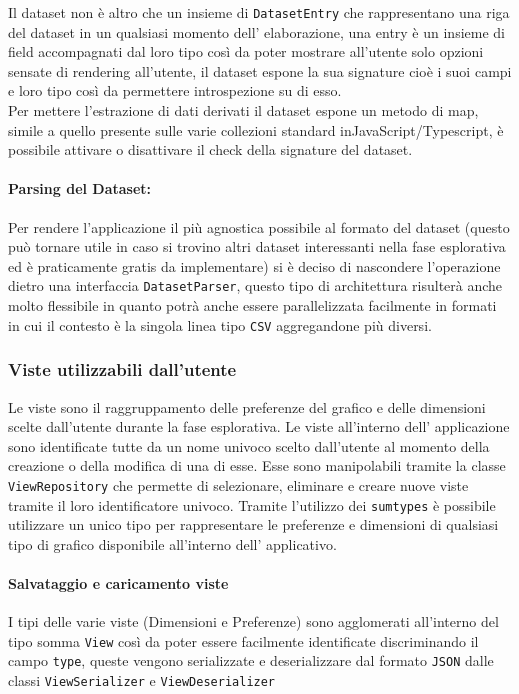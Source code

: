 \noindent
Il dataset non è altro che un insieme di \texttt{DatasetEntry} che rappresentano
una riga del dataset in un qualsiasi momento dell' elaborazione, una entry è un
insieme di field accompagnati dal loro tipo così da poter mostrare all'utente
solo opzioni sensate di rendering all'utente, il dataset espone la sua signature
cioè i suoi campi e loro tipo così da permettere introspezione su di esso.\\

\noindent
Per mettere l'estrazione di dati derivati il dataset espone un metodo di map, 
simile a quello presente sulle varie collezioni standard inJavaScript/Typescript, 
è possibile attivare o disattivare il check della signature del dataset.

\paragraph{Parsing del Dataset:}
Per rendere l'applicazione il più agnostica possibile al formato del dataset 
(questo può tornare utile in caso si trovino altri dataset interessanti nella
fase esplorativa ed è praticamente gratis da implementare) si è deciso di
nascondere l'operazione dietro una interfaccia \texttt{DatasetParser}, questo
tipo di architettura risulterà anche molto flessibile in quanto potrà anche
essere parallelizzata facilmente in formati in cui il contesto è la singola
linea tipo \texttt{CSV} aggregandone più diversi.

\subsubsection{Viste utilizzabili dall'utente}
Le viste sono il raggruppamento delle preferenze del grafico e delle dimensioni
scelte dall'utente durante la fase esplorativa. Le viste all'interno dell'
applicazione sono identificate tutte da un nome univoco scelto dall'utente al 
momento della creazione o della modifica di una di esse. Esse sono manipolabili
tramite la classe \texttt{ViewRepository} che permette di selezionare, eliminare
e creare nuove viste tramite il loro identificatore univoco. Tramite l'utilizzo
dei \texttt{sumtypes} è possibile utilizzare un unico tipo per rappresentare le
preferenze e dimensioni di qualsiasi tipo di grafico disponibile all'interno
dell' applicativo.

\paragraph{Salvataggio e caricamento viste}
I tipi delle varie viste (Dimensioni e Preferenze) sono agglomerati all'interno
del tipo somma \texttt{View} così da poter essere facilmente identificate
discriminando il campo \texttt{type}, queste vengono serializzate e
deserializzare dal formato \texttt{JSON} dalle classi \texttt{ViewSerializer} e
\texttt{ViewDeserializer}

